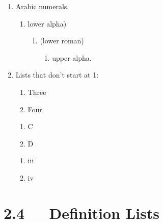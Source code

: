 \documentclass[a4paper]{memoir}
\newcounter{enumv}
\begin{document}
\begin{enumerate}
\item Arabic numerals.

\begin{enumerate}
\renewcommand{\labelenumii}{\alph{enumii})}
\item lower alpha)

\begin{enumerate}
\renewcommand{\labelenumiii}{(\roman{enumiii})}
\item (lower roman)

\begin{enumerate}
\item upper alpha.

\end{enumerate}
\end{enumerate}
\end{enumerate}

\item Lists that don't start at 1:

\begin{enumerate}
\renewcommand{\labelenumii}{\arabic{enumii}.}
\setcounter{enumii}{2}
\item Three

\item Four
\end{enumerate}

\begin{enumerate}
\renewcommand{\labelenumii}{\Alph{enumii}.}
\setcounter{enumii}{2}
\item C

\item D
\end{enumerate}

\begin{enumerate}
\renewcommand{\labelenumii}{\roman{enumii}.}
\setcounter{enumii}{2}
\item iii

\item iv
\end{enumerate}
\end{enumerate}


\section{2.4   Definition Lists%
  \label{definition-lists}%
}
\end{document}
